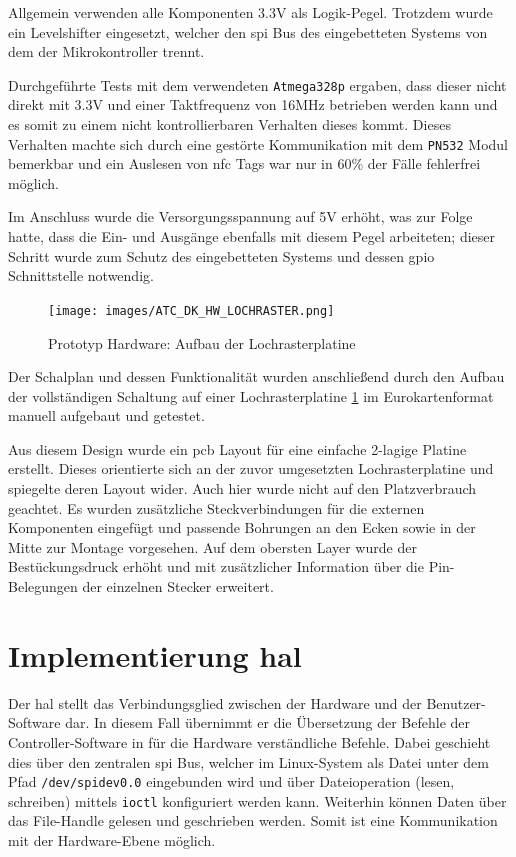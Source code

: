 Allgemein verwenden alle Komponenten 3.3V als Logik-Pegel. Trotzdem
wurde ein Levelshifter eingesetzt, welcher den \gls{spi} Bus des
eingebetteten Systems von dem der Mikrokontroller trennt.

Durchgeführte Tests mit dem verwendeten
\passthrough{\lstinline!Atmega328p!} ergaben, dass dieser nicht direkt
mit 3.3V und einer Taktfrequenz von 16MHz betrieben werden kann und es
somit zu einem nicht kontrollierbaren Verhalten dieses kommt. Dieses
Verhalten machte sich durch eine gestörte Kommunikation mit dem
\passthrough{\lstinline!PN532!} Modul bemerkbar und ein Auslesen von
\gls{nfc} Tags war nur in 60\% der Fälle fehlerfrei möglich.

Im Anschluss wurde die Versorgungsspannung auf 5V erhöht, was zur Folge
hatte, dass die Ein- und Ausgänge ebenfalls mit diesem Pegel arbeiteten;
dieser Schritt wurde zum Schutz des eingebetteten Systems und dessen
\gls{gpio} Schnittstelle notwendig.

\begin{figure}
\centering
\texttt{[image: images/ATC\_DK\_HW\_LOCHRASTER.png]}
\caption{Prototyp Hardware: Aufbau der Lochrasterplatine
\label{ATC_DK_HW_LOCHRASTER}}
\end{figure}

Der Schalplan und dessen Funktionalität wurden anschließend durch den
Aufbau der vollständigen Schaltung auf einer Lochrasterplatine
\ref{ATC_DK_HW_LOCHRASTER} im Eurokartenformat manuell aufgebaut und
getestet.

Aus diesem Design wurde ein \gls{pcb} Layout für eine einfache 2-lagige
Platine erstellt. Dieses orientierte sich an der zuvor umgesetzten
Lochrasterplatine und spiegelte deren Layout wider. Auch hier wurde
nicht auf den Platzverbrauch geachtet. Es wurden zusätzliche
Steckverbindungen für die externen Komponenten eingefügt und passende
Bohrungen an den Ecken sowie in der Mitte zur Montage vorgesehen. Auf
dem obersten Layer wurde der Bestückungsdruck erhöht und mit
zusätzlicher Information über die Pin-Belegungen der einzelnen Stecker
erweitert.

\hypertarget{implementierung-hal}{%
\section{\texorpdfstring{Implementierung
\gls{hal}}{Implementierung }}\label{implementierung-hal}}

Der \gls{hal} stellt das Verbindungsglied zwischen der Hardware und der
Benutzer-Software dar. In diesem Fall übernimmt er die Übersetzung der
Befehle der Controller-Software in für die Hardware verständliche
Befehle. Dabei geschieht dies über den zentralen \gls{spi} Bus, welcher
im Linux-System als Datei unter dem Pfad
\passthrough{\lstinline!/dev/spidev0.0!} eingebunden wird und über
Dateioperation (lesen, schreiben) mittels
\passthrough{\lstinline!ioctl!} konfiguriert werden kann. Weiterhin
können Daten über das File-Handle gelesen und geschrieben werden. Somit
ist eine Kommunikation mit der Hardware-Ebene möglich.

